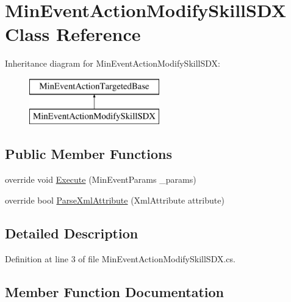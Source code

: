 \hypertarget{class_min_event_action_modify_skill_s_d_x}{}\section{Min\+Event\+Action\+Modify\+Skill\+S\+DX Class Reference}
\label{class_min_event_action_modify_skill_s_d_x}
Inheritance diagram for Min\+Event\+Action\+Modify\+Skill\+S\+DX\+:\begin{figure}[H]
\begin{center}
\leavevmode
\includegraphics[height=2.000000cm]{d1/ddd/class_min_event_action_modify_skill_s_d_x}
\end{center}
\end{figure}
\subsection*{Public Member Functions}
\begin{DoxyCompactItemize}
\item 
override void \mbox{\hyperlink{class_min_event_action_modify_skill_s_d_x_a36c92e54bc7ac78aec0b96b0b6767681}{Execute}} (Min\+Event\+Params \+\_\+params)
\item 
override bool \mbox{\hyperlink{class_min_event_action_modify_skill_s_d_x_a2f8c470805a87d707487c261bd641ded}{Parse\+Xml\+Attribute}} (Xml\+Attribute attribute)
\end{DoxyCompactItemize}


\subsection{Detailed Description}


Definition at line 3 of file Min\+Event\+Action\+Modify\+Skill\+S\+D\+X.\+cs.



\subsection{Member Function Documentation}
\mbox{\label{class_min_event_action_modify_skill_s_d_x_a36c92e54bc7ac78aec0b96b0b6767681}} 
